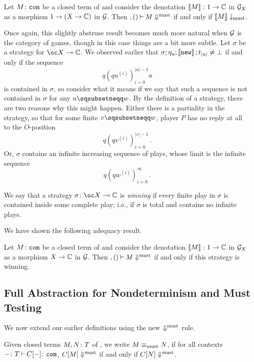 \documentclass{article}
\begin{document}
\begin{corollary}
  Let $M\colon {\mathtt{com}}$ be a closed term of \IAX and consider the denotation $\left\llbracket M\right\rrbracket \colon 1 \to \mathbb{C}$ in $\mathcal G_X$ as a morphism $1 \to (X \to \mathbb{C})$ in $\mathcal G$.
  Then $,()\mathbin{\vdash} M\Downarrow^{\text{must}}$ if and only if $\left\llbracket M\right\rrbracket\downarrow_{\operatorname{must}}$.
  \label{CorAdeqMust}
\end{corollary}

Once again, this slightly abstruse result becomes much more natural when $\mathcal G$ is the category of games, though in this case things are a bit more subtle.  
Let $\sigma$ be a strategy for $\oc X \implies \bC$.  
We observed earlier that $\sigma;\eta_u;\left\llbracket{\mathtt{new}}\right\rrbracket;t_{|u|}\neq\bot$ if and only if the sequence
\[
  q(qu^{(i)})_{i=0}^{|u|-1} a
  \]
is contained in $\sigma$, so consider what it means if we say that such a sequence is not contained in $\sigma$ for any $u\pprefix w$.  
By the definition of a strategy, there are two reasons why this might happen.  
Either there is a partiality in the strategy, so that for some finite $v\pprefix w$, player $P$ has no reply at all to the $O$-position
\[
  q(qv^{(i)})_{i=0}^{|v|-1}\,.
  \]
Or, $\sigma$ contains an infinite increasing sequence of plays, whose limit is the infinite sequence
\[
  q(qw^{(i)})_{i=0}^\infty\,.
  \]
\begin{definition}
  We say that a strategy $\sigma\from \oc X \implies \bC$ is \emph{winning} if every finite play in $\sigma$ is contained inside some complete play; i.e., if $\sigma$ is total and contains no infinite plays.
\end{definition}

We have shown the following adequacy result.
\begin{corollary}
  Let $M\colon {\mathtt{com}}$ be a closed term of \IAX and consider the denotation $\left\llbracket M\right\rrbracket \colon 1 \to \mathbb{C}$ in $\mathcal G_X$ as a morphism $X \to \mathbb{C}$ in $\mathcal G$.
  Then $,()\mathbin{\vdash} M\Downarrow^{\text{must}}$ if and only if this strategy is winning.
\end{corollary}

\subsection{Full Abstraction for Nondeterminism and Must Testing}

We now extend our earlier definitions using the new $\Downarrow^{\text{must}}$ rule.

\begin{definition}
  Given closed terms $M,N\colon T$ of \IAX, we write $M\equiv_{\operatorname{must}} N$, if for all contexts $-\colon T\mathbin{\vdash} C[-]\colon{\mathtt{com}}$, $C[M]\Downarrow^{\text{must}}$ if and only if $C[N]\Downarrow^{\text{must}}$.
\end{definition}
\end{document}
